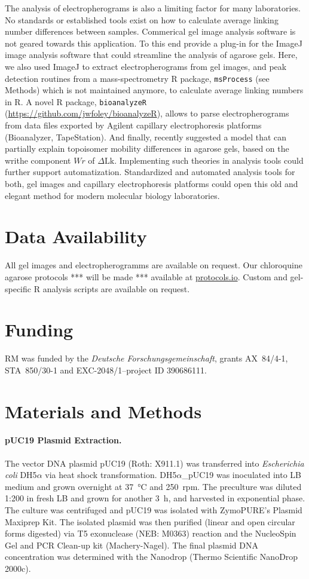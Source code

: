 \documentclass[10pt,a4]{article}
\newcommand{\dlk}{\ensuremath{\Delta\text{Lk}}}
\newcommand{\TODO}[1]{\begingroup\color{red}*** #1 ***\endgroup}
\begin{document}
The analysis of electropherograms is also a limiting factor for many
laboratories. No standards or established tools exist on how to
calculate average linking number differences between
samples. Commerical gel image analysis software is not geared towards
this application. To this end \citet{Ziraldo2019} provide a plug-in
for the ImageJ image analysis software that could streamline the
analysis of agarose gels. Here, we also used ImageJ to extract
electropherograms from gel images, and peak detection routines from a
mass-spectrometry R package, \texttt{msProcess} (see Methods) which is
not maintained anymore, to calculate average linking numbers in R. A
novel R package, \texttt{bioanalyzeR}
(\url{https://github.com/jwfoley/bioanalyzeR}), allows to parse
electropherograms from data files exported by Agilent capillary
electrophoresis platforms (Bioanalyzer, TapeStation).
%
And finally, \citet{Vetcher2010} recently suggested a model that can
partially explain topoisomer mobility differences in agarose gels,
based on the writhe component $Wr$ of \dlk{}. Implementing such
theories in analysis tools could further support automatization.
Standardized and automated analysis tools for both, gel images and
capillary electrophoresis platforms could open this old and elegant
method for modern molecular biology laboratories.



\section*{Data Availability}
All gel images and electropherogramms are available on request. Our
chloroquine agarose protocols \TODO{will be made} available at
\url{protocols.io}. Custom and gel-specific R analysis scripts are
available on request.

\section*{Funding}
RM was funded by the \textit{Deutsche Forschungsgemeinschaft}, grants
AX~84/4-1, STA~850/30-1 and EXC-2048/1--project ID 390686111. 


\section{Materials and Methods}

\paragraph{pUC19 Plasmid Extraction.}
The vector DNA plasmid pUC19 (Roth: X911.1) was transferred into
\textit{Escherichia coli} DH5$\alpha$ via heat shock
transformation. DH5$\alpha$\_pUC19 was inoculated into LB medium and
grown overnight at \SI{37}{\celsius} and \SI{250}{rpm}. The preculture
was diluted 1:200 in fresh LB and grown for another \SI{3}{\hour}, and
harvested in exponential phase. The culture was centrifuged and pUC19
was isolated with ZymoPURE's Plasmid Maxiprep Kit. The isolated
plasmid was then purified (linear and open circular forms digested)
via T5 exonuclease (NEB: M0363) reaction and the NucleoSpin Gel and
PCR Clean-up kit (Machery-Nagel). The final plasmid DNA concentration
was determined with the Nanodrop (Thermo Scientific NanoDrop 2000c).
%
\end{document}
